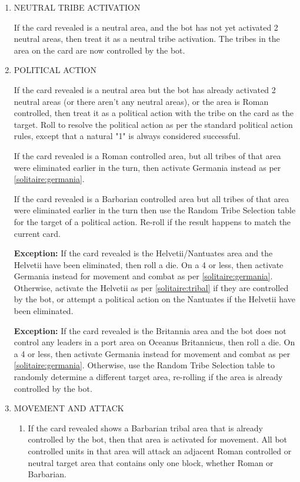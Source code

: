 \renewcommand{\labelenumii}{\alph{enumii}.}
\begin{enumerate}
  \item NEUTRAL TRIBE ACTIVATION

  If the card revealed is a neutral area, and the bot has not yet activated 2 neutral areas, then treat it as a neutral tribe activation. The tribes in the area on the card are now controlled by the bot.

  \item POLITICAL ACTION

  If the card revealed is a neutral area but the bot has already activated 2 neutral areas (or there aren't any neutral areas), or the area is Roman controlled, then treat it as a political action with the tribe on the card as the target. Roll to resolve the political action as per the standard political action rules, except that a natural "1" is always considered successful.

  If the card revealed is a Roman controlled area, but all tribes of that area were eliminated earlier in the turn, then activate Germania instead as per \ref{solitaire:germania}.

  If the card revealed is a Barbarian controlled area but all tribes of that area were eliminated earlier in the turn then use the Random Tribe Selection table for the target of a political action. Re-roll if the result happens to match the current card.

  \textbf{Exception:} If the card revealed is the Helvetii/Nantuates area and the Helvetii have been eliminated, then roll a die. On a 4 or less, then activate Germania instead for movement and combat as per \ref{solitaire:germania}. Otherwise, activate the Helvetii as per \ref{solitaire:tribal} if they are controlled by the bot, or attempt a political action on the Nantuates if the Helvetii have been eliminated.

  \textbf{Exception:} If the card revealed is the Britannia area and the bot does not control any leaders in a port area on Oceanus Britannicus, then roll a die. On a 4 or less, then activate Germania instead for movement and combat as per \ref{solitaire:germania}. Otherwise, use the Random Tribe Selection table to randomly determine a different target area, re-rolling if the area is already controlled by the bot.

  \item MOVEMENT AND ATTACK

  \begin{enumerate}[leftmargin=0in]
    \item \label{solitaire:tribal} If the card revealed shows a Barbarian tribal area that is already controlled by the bot, then that area is activated for movement. All bot controlled units in that area will attack an adjacent Roman controlled or neutral target area that contains only one block, whether Roman or Barbarian.


\end{enumerate}
\end{enumerate}
